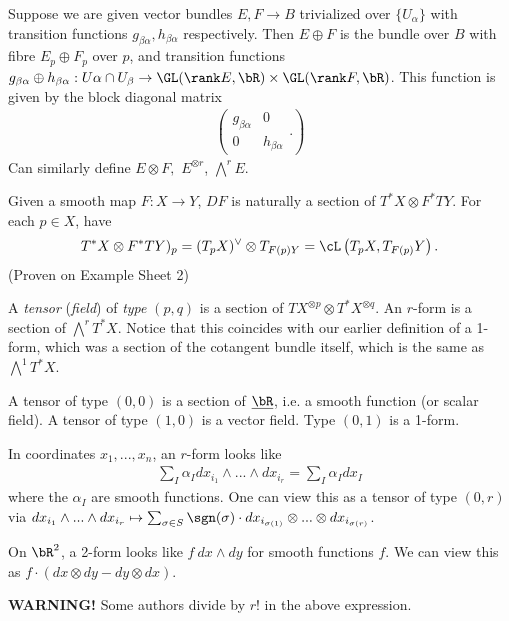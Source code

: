 \begin{example}\label{example:lec2.42}
	Suppose we are given vector bundles $E,F \to B$ trivialized over $\{U_\alpha\}$ with transition functions $g_{\beta\alpha}, h_{\beta\alpha}$ respectively. Then $E\oplus F$ is the bundle over $B$ with fibre $E_p\oplus F_p$ over $p$, and transition functions $g_{\beta\alpha}\oplus h_{\beta\alpha}:U\alpha\cap U_\beta\to \GL(\rank E,\bR) \times \GL(\rank F,\bR)$. This function is given by the block diagonal matrix
	\begin{align*}
		\left(
		\begin{array}{c|c}
			g_{\beta\alpha} & 0 \\
			\hline
			0 & h_{\beta\alpha}
		\end{array}. \right)
	\end{align*}
	Can similarly define $E\otimes F,$ $E^{\otimes r}$, $\bigwedge^r E$.
\end{example}
\begin{example}\label{example:lec2.43}
	Given a smooth map $F:X\to Y$, $DF$ is naturally a section of $T^*X\otimes F^*TY$. For each $p \in X$, have
	\begin{align*}
		T^*X\otimes F^*TY)_p = (T_pX)^\vee \otimes T_{F(p) Y} = \cL\left(T_pX,T_{F(p)}Y\right).
	\end{align*}
	(Proven on Example Sheet 2)
\end{example}
\begin{defn}\label{defn:lec2.44}
	A \emph{tensor} (\emph{field}) of \emph{type} $(p,q)$ is a section of $TX^{\otimes p}\otimes T^*X^{\otimes q}$. An $r$-form is a section of $\bigwedge^r T^*X$. Notice that this coincides with our earlier definition of a 1-form, which was a section of the cotangent bundle itself, which is the same as $\bigwedge^1T^*X$.
\end{defn}
\begin{example}\label{example:lec2.45}
	A tensor of type $(0,0)$ is a section of $\underline{\bR}$, i.e. a smooth function (or scalar field). A tensor of type $(1,0)$ is a vector field. Type $(0,1)$ is a 1-form.
\end{example}

In coordinates $x_1,...,x_n$, an $r$-form looks like
\begin{align*}
	\sum_{I}\alpha_I dx_{i_1} \wedge...\wedge dx_{i_r} = \sum_{I}\alpha_Idx_I
\end{align*}
where the $\alpha_I$ are smooth functions. One can view this as a tensor of type $(0,r)$ via $dx_{i_1}\wedge ... \wedge dx_{i_r} \mapsto \sum_{\sigma \in S}\sgn(\sigma)\cdot dx_{i_{\sigma(1)}} \otimes ...\otimes dx_{i_{\sigma(r)}}$.

\begin{example}\label{example:lec2.46}
	On $\bR^2$, a 2-form looks like $f~dx\wedge dy$ for smooth functions $f$. We can view this as $f\cdot(dx\otimes dy - dy\otimes dx)$.
\end{example}

\textbf{WARNING!} Some authors divide by $r!$ in the above expression.






